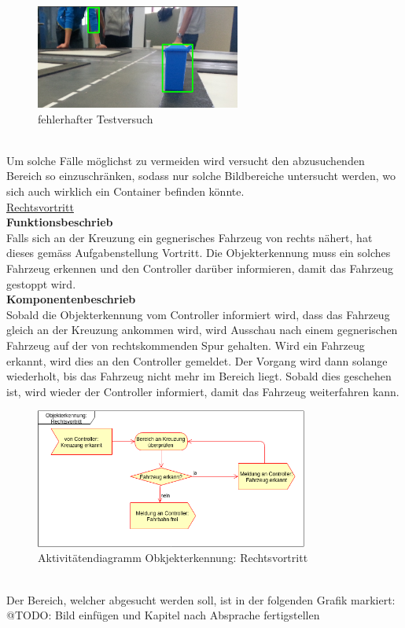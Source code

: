 \begin{figure}[H]%
\centering
\includegraphics[width=0.6\textwidth]{03_Loesungskonzept/pictures/objekterkennung_blau_fehl.png}
\caption{fehlerhafter Testversuch}
\label{fig:fehlerhafter Testversuch}
\end{figure}\\
Um solche Fälle möglichst zu vermeiden wird versucht den abzusuchenden Bereich so einzuschränken, sodass nur solche Bildbereiche untersucht werden, wo sich auch wirklich ein Container befinden könnte. 
\\[0.2cm]
\underline{Rechtsvortritt}
\\[0.2cm]
\textbf{Funktionsbeschrieb}\\
Falls sich an der Kreuzung ein gegnerisches Fahrzeug von rechts nähert, hat dieses gemäss Aufgabenstellung Vortritt. Die Objekterkennung muss ein solches Fahrzeug erkennen und den Controller darüber informieren, damit das Fahrzeug gestoppt wird.
\\[0.2cm]
\textbf{Komponentenbeschrieb}\\
Sobald die Objekterkennung vom Controller informiert wird, dass das Fahrzeug gleich an der Kreuzung ankommen wird, wird Ausschau nach einem gegnerischen Fahrzeug auf der von rechtskommenden Spur gehalten. Wird ein Fahrzeug erkannt, wird dies an den Controller gemeldet. Der Vorgang wird dann solange wiederholt, bis das Fahrzeug nicht mehr im Bereich liegt. Sobald dies geschehen ist, wird wieder der Controller informiert, damit das Fahrzeug weiterfahren kann.
\begin{figure}[H]%
\centering
\includegraphics[width=0.8\textwidth]{03_Loesungskonzept/pictures/objekterkennung_rechtsvortritt.png}
\caption{Aktivitätendiagramm Obkjekterkennung: Rechtsvortritt}
\label{fig:activityRechtsvortritt}
\end{figure}\\
Der Bereich, welcher abgesucht werden soll, ist in der folgenden Grafik markiert:
\\
@TODO: Bild einfügen und Kapitel nach Absprache fertigstellen
\\
